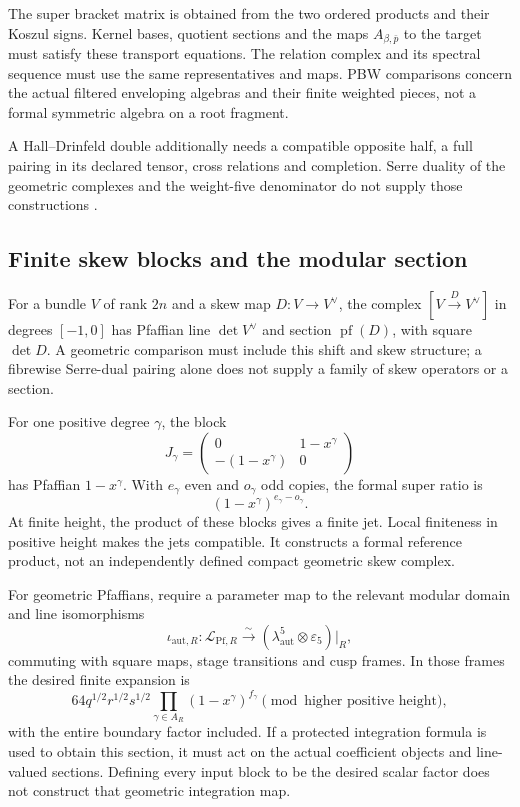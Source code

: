 The super bracket matrix is obtained from the two ordered products
and their Koszul signs. Kernel bases, quotient sections and the
maps \(A_{\beta,\bar p}\) to the target must satisfy these
transport equations. The relation complex and its spectral sequence
must use the same representatives and maps. PBW comparisons concern
the actual filtered enveloping algebras and their finite weighted
pieces, not a formal symmetric algebra on a root fragment.

A Hall--Drinfeld double additionally needs a compatible opposite
half, a full pairing in its declared tensor, cross relations and
completion. Serre duality of the geometric complexes and the
weight-five denominator do not supply those constructions
\cite{CYQGVolIII}.

\subsection{Finite skew blocks and the modular section}
\label{app:build-dirac-pfaffian}

For a bundle \(V\) of rank \(2n\) and a skew map
\(D:V\to V^\vee\), the complex
\([V\xrightarrow D V^\vee]\) in degrees \([-1,0]\) has
Pfaffian line \(\det V^\vee\) and section
\(\operatorname{pf}(D)\), with square \(\det D\).
A geometric comparison must include this shift and skew structure;
a fibrewise Serre-dual pairing alone does not supply a family of
skew operators or a section.

For one positive degree \(\gamma\), the block
\[
 J_\gamma=
 \begin{pmatrix}0&1-x^\gamma\\-(1-x^\gamma)&0\end{pmatrix}
\]
has Pfaffian \(1-x^\gamma\). With \(e_\gamma\) even and
\(o_\gamma\) odd copies, the formal super ratio is
\[
 (1-x^\gamma)^{e_\gamma-o_\gamma}.
\]
At finite height, the product of these blocks gives a finite jet.
Local finiteness in positive height makes the jets compatible. It
constructs a formal reference product, not an independently defined
compact geometric skew complex.

For geometric Pfaffians, require a parameter map to the relevant
modular domain and line isomorphisms
\[
 \iota_{\mathrm{aut},R}:\mathscr L_{\mathrm{Pf},R}
       \xrightarrow{\sim}
       (\lambda_{\mathrm{aut}}^5\otimes\varepsilon_5)|_R,
\]
commuting with square maps, stage transitions and cusp frames.
In those frames the desired finite expansion is
\[
 64q^{1/2}r^{1/2}s^{1/2}
       \prod_{\gamma\in A_R}(1-x^\gamma)^{f_\gamma}
       \pmod{\text{higher positive height}},
\]
with the entire boundary factor included. If a protected integration
formula is used to obtain this section, it must act on the actual
coefficient objects and line-valued sections. Defining every input
block to be the desired scalar factor does not construct that
geometric integration map.

